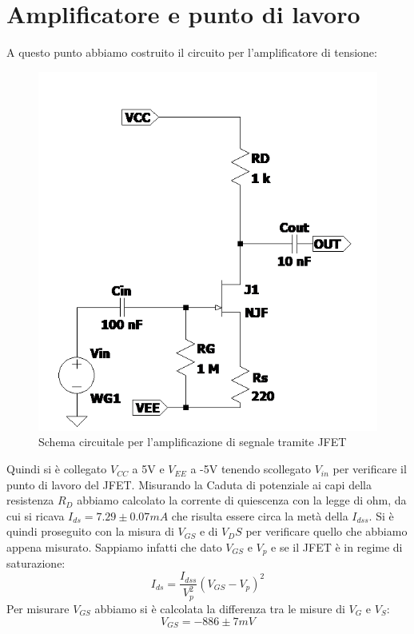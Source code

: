 \documentclass[10pt, a4paper, italian]{article}
\begin{document}
\section{Amplificatore e punto di lavoro}
A questo punto abbiamo costruito il circuito per l'amplificatore di tensione:
\begin{figure}[htbp]
    \centering
	\includegraphics[scale=0.7]{Draft2}
    \caption{Schema circuitale per l'amplificazione di segnale tramite JFET}
\end{figure}
Quindi si è collegato $V_{CC}$ a 5V e $V_{EE}$ a -5V tenendo scollegato $V_{in}$ per verificare il punto di lavoro del JFET.
Misurando la Caduta di potenziale ai capi della resistenza $R_D$ abbiamo calcolato la corrente di quiescenza con la legge di ohm, da cui si ricava $I_{ds}=7.29 \pm 0.07 mA$ che risulta essere circa la metà della $I_{dss}$.
Si è quindi proseguito con la misura di $V_{GS}$ e di $V_DS$ per verificare quello che abbiamo appena misurato.
Sappiamo infatti che dato $V_{GS}$ e $V_p$ e se il JFET è in regime di saturazione:
\begin{equation}
I_{ds}=\frac{I_{dss}}{V_p ^2}(V_{GS}-V_p)^2
\end{equation}
Per misurare $V_{GS}$ abbiamo si è calcolata la differenza tra le misure di $V_G$ e $V_S$:
\[
V_{GS}=-886 \pm 7 mV
\]
\end{document}
